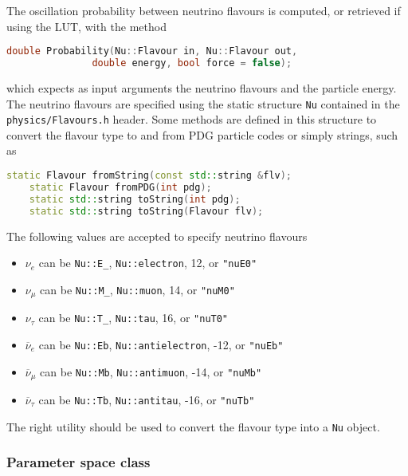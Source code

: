 \documentclass[a4paper, 11pt]{article}
\newcommand{\cj}{\overline}
\begin{document}
The oscillation probability between neutrino flavours is computed, or retrieved if using the LUT, with the method
\begin{lstlisting}[language=C++]
    double Probability(Nu::Flavour in, Nu::Flavour out,
		       double energy, bool force = false);
\end{lstlisting}
which expects as input arguments the neutrino flavours and the particle energy.
The neutrino flavours are specified using the static structure \texttt{Nu} contained in the \texttt{physics/Flavours.h} header.
Some methods are defined in this structure to convert the flavour type to and from PDG particle codes or simply strings,
such as
\begin{lstlisting}[language=C++]
    static Flavour fromString(const std::string &flv);
    static Flavour fromPDG(int pdg);
    static std::string toString(int pdg);
    static std::string toString(Flavour flv);
\end{lstlisting}
The following values are accepted to specify neutrino flavours
\begin{itemize}
		\small
	\item $\nu_e$         can be \texttt{Nu::E\_}, \texttt{Nu::electron}, 12, or \texttt{"nuE0"}
	\item $\nu_\mu$       can be \texttt{Nu::M\_}, \texttt{Nu::muon}, 14, or \texttt{"nuM0"}
	\item $\nu_\tau$      can be \texttt{Nu::T\_}, \texttt{Nu::tau}, 16, or \texttt{"nuT0"}
	\item $\cj{\nu}_e$    can be \texttt{Nu::Eb}, \texttt{Nu::antielectron}, -12, or \texttt{"nuEb"}
	\item $\cj{\nu}_\mu$  can be \texttt{Nu::Mb}, \texttt{Nu::antimuon}, -14, or \texttt{"nuMb"}
	\item $\cj{\nu}_\tau$ can be \texttt{Nu::Tb}, \texttt{Nu::antitau}, -16, or \texttt{"nuTb"}
\end{itemize}
The right utility should be used to convert the flavour type into a \texttt{Nu} object.


\subsubsection{Parameter space class}
\label{sec:parameter_space}
\end{document}
